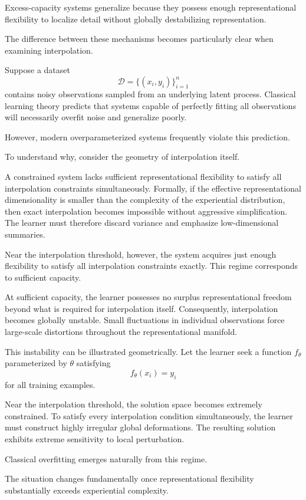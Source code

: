 \documentclass[12pt,a4paper]{article}
\begin{document}
Excess-capacity systems generalize because they possess enough representational flexibility to localize detail without globally destabilizing representation.

The difference between these mechanisms becomes particularly clear when examining interpolation.

Suppose a dataset
\[
\mathcal{D} = \{(x_i,y_i)\}_{i=1}^{n}
\]
contains noisy observations sampled from an underlying latent process. Classical learning theory predicts that systems capable of perfectly fitting all observations will necessarily overfit noise and generalize poorly.

However, modern overparameterized systems frequently violate this prediction.

To understand why, consider the geometry of interpolation itself.

A constrained system lacks sufficient representational flexibility to satisfy all interpolation constraints simultaneously. Formally, if the effective representational dimensionality is smaller than the complexity of the experiential distribution, then exact interpolation becomes impossible without aggressive simplification. The learner must therefore discard variance and emphasize low-dimensional summaries.

Near the interpolation threshold, however, the system acquires just enough flexibility to satisfy all interpolation constraints exactly. This regime corresponds to sufficient capacity.

At sufficient capacity, the learner possesses no surplus representational freedom beyond what is required for interpolation itself. Consequently, interpolation becomes globally unstable. Small fluctuations in individual observations force large-scale distortions throughout the representational manifold.

This instability can be illustrated geometrically. Let the learner seek a function \(f_\theta\) parameterized by \(\theta\) satisfying
\[
f_\theta(x_i) = y_i
\]
for all training examples.

Near the interpolation threshold, the solution space becomes extremely constrained. To satisfy every interpolation condition simultaneously, the learner must construct highly irregular global deformations. The resulting solution exhibits extreme sensitivity to local perturbation.

Classical overfitting emerges naturally from this regime.

The situation changes fundamentally once representational flexibility substantially exceeds experiential complexity.
\end{document}
